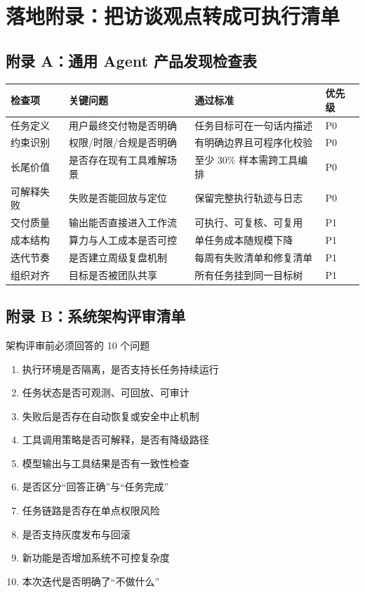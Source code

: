 \section{落地附录：把访谈观点转成可执行清单}

\subsection{附录 A：通用 Agent 产品发现检查表}

\begin{center}
\begin{tabular}{p{3.1cm}p{3.4cm}p{5.8cm}p{2.2cm}}
\toprule
检查项 & 关键问题 & 通过标准 & 优先级 \\
\midrule
任务定义 & 用户最终交付物是否明确 & 任务目标可在一句话内描述 & P0 \\
约束识别 & 权限/时限/合规是否明确 & 有明确边界且可程序化校验 & P0 \\
长尾价值 & 是否存在现有工具难解场景 & 至少 30\% 样本需跨工具编排 & P0 \\
可解释失败 & 失败是否能回放与定位 & 保留完整执行轨迹与日志 & P0 \\
交付质量 & 输出能否直接进入工作流 & 可执行、可复核、可复用 & P1 \\
成本结构 & 算力与人工成本是否可控 & 单任务成本随规模下降 & P1 \\
迭代节奏 & 是否建立周级复盘机制 & 每周有失败清单和修复清单 & P1 \\
组织对齐 & 目标是否被团队共享 & 所有任务挂到同一目标树 & P1 \\
\bottomrule
\end{tabular}
\end{center}

\subsection{附录 B：系统架构评审清单}

\begin{importantbox}{架构评审前必须回答的 10 个问题}
\begin{enumerate}
    \item 执行环境是否隔离，是否支持长任务持续运行
    \item 任务状态是否可观测、可回放、可审计
    \item 失败后是否存在自动恢复或安全中止机制
    \item 工具调用策略是否可解释，是否有降级路径
    \item 模型输出与工具结果是否有一致性检查
    \item 是否区分“回答正确”与“任务完成”
    \item 任务链路是否存在单点权限风险
    \item 是否支持灰度发布与回滚
    \item 新功能是否增加系统不可控复杂度
    \item 本次迭代是否明确了“不做什么”
\end{enumerate}
\end{importantbox}


